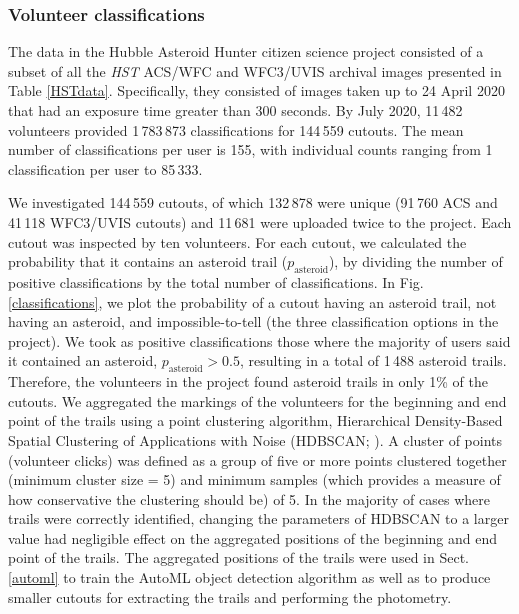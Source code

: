 \documentclass{aa}
\begin{document}
\subsubsection{Volunteer classifications}
\label{volunteerclassifications}

The data in the Hubble Asteroid Hunter citizen science project consisted of a subset of all the \textit{HST} ACS/WFC and WFC3/UVIS archival images presented in Table \ref{HSTdata}. Specifically, they consisted of images taken up to 24 April 2020 that had an exposure time greater than 300 seconds. By July 2020, 11\,482 volunteers provided 1\,783\,873 classifications for 144\,559 cutouts. The mean number of classifications per user is 155, with individual counts ranging from 1 classification per user to 85\,333. 

We investigated 144\,559 cutouts, of which 132\,878 were unique  (91\,760 ACS and 41\,118 WFC3/UVIS cutouts) and 11\,681 were uploaded twice to the project. Each cutout was inspected by ten volunteers. For each cutout, we calculated the probability that it contains an asteroid trail ($p_{\mathrm{asteroid}}$), by dividing the number of positive classifications by the total number of classifications. In Fig. \ref{classifications}, we plot the probability of a cutout having an asteroid trail, not having an asteroid, and impossible-to-tell (the three classification options in the project). We took as positive classifications those where the majority of users said it contained an asteroid, $p_{\mathrm{asteroid}}>0.5$, resulting in a total of 1\,488 asteroid trails. Therefore, the volunteers in the project found asteroid trails in only 1\% of the cutouts. We aggregated the markings of the volunteers for the beginning and end point of the trails using a point clustering algorithm, Hierarchical Density-Based Spatial Clustering of Applications with Noise (\textsc{HDBSCAN}; \citealt{Campello2013}). A cluster of points (volunteer clicks) was defined as a group of five or more points clustered together (minimum cluster size = 5) and minimum samples (which provides a measure of how conservative the clustering should be) of 5. In the majority of cases where trails were correctly identified, changing the parameters of \textsc{HDBSCAN} to a larger value had negligible effect on the aggregated positions of the beginning and end point of the trails. The aggregated positions of the trails were used in Sect. \ref{automl} to train the AutoML object detection algorithm as well as to produce smaller cutouts for extracting the trails and performing the photometry. 
\end{document}
